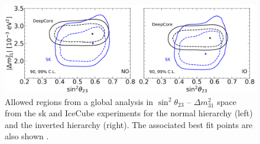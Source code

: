 \begin{figure}[h!]
    \centering
    \includegraphics[width = \largefigwidth]{figures-chap2/theta_23_2.png}   
    \caption[Allowed regions in $\sin^2{\theta_{23}}$ -- $\Delta m^2_{31}$ space from the \gls{sk} and IceCube DeepCore experiments.]{Allowed regions from a global analysis in $\sin^2{\theta_{23}}$ -- $\Delta m^2_{31}$ space from the \gls{sk} and IceCube experiments for the normal hierarchy (left) and the inverted hierarchy (right). The associated best fit points are also shown \cite{2020_global_reassessment_of_the_neutrino_oscillation_picture}.}
    \label{fig:sk_icecube}
\end{figure}


